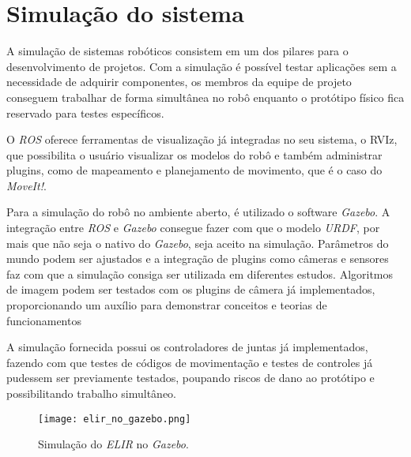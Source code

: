 \section{Simulação do sistema}
\label{sec:sim}
A simulação de sistemas robóticos consistem em um dos pilares para o desenvolvimento de projetos. Com a simulação é possível testar aplicações sem a necessidade de adquirir componentes, os membros da equipe de projeto conseguem trabalhar de forma simultânea no robô enquanto o protótipo físico fica reservado para testes específicos.

O \textit{ROS} oferece ferramentas de visualização já integradas no seu sistema, o RVIz, que possibilita o usuário visualizar os modelos do robô e também administrar plugins, como de mapeamento e planejamento de movimento, que é o caso do \textit{MoveIt!}.

Para a simulação do robô no ambiente aberto, é utilizado  o software \textit{Gazebo}. A integração entre \textit{ROS} e \textit{Gazebo} consegue fazer com que o modelo \textit{URDF}, por mais que não seja o nativo do \textit{Gazebo}, seja aceito na simulação. Parâmetros do mundo podem ser ajustados e a integração de plugins como câmeras e sensores faz com que a simulação consiga ser utilizada em diferentes estudos. Algoritmos de imagem podem ser testados com os plugins de câmera já implementados, proporcionando um auxílio para demonstrar conceitos e teorias de funcionamentos

A simulação fornecida possui os controladores de juntas já implementados, fazendo com que testes de códigos de movimentação e testes de controles já pudessem ser previamente testados, poupando riscos de dano ao protótipo e possibilitando trabalho simultâneo.

\begin{figure}[h!]												
	\centering												
	\texttt{[image: elir\_no\_gazebo.png]}				
	\caption{Simulação do \textit{ELIR} no \textit{Gazebo}.}		
	\label{img:gazebo1}									
\end{figure}

